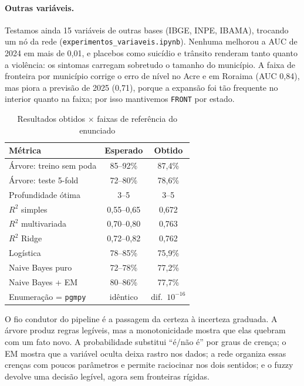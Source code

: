 \documentclass[article,12pt,oneside,a4paper,brazil,sumario=tradicional]{abntex2}
\newcommand{\fonteautores}{\fonte{Elaborada pelos autores (2026).}}
\begin{document}
\paragraph{Outras variáveis.}\label{sec:exp} Testamos ainda 15 variáveis de outras bases
(IBGE, INPE, IBAMA), trocando um nó da rede (\texttt{experimentos\_variaveis.ipynb}).
Nenhuma melhorou a AUC de 2024 em mais de 0,01, e placebos como suicídio e trânsito
renderam tanto quanto a violência: os sintomas carregam sobretudo o tamanho do município. A
faixa de fronteira por município corrige o erro de nível no Acre e em Roraima (AUC 0,84),
mas piora a previsão de 2025 (0,71), porque a expansão foi tão frequente no interior quanto
na faixa; por isso mantivemos \texttt{FRONT} por estado.

\begin{table}[htbp]
\centering\small
\caption{Resultados obtidos $\times$ faixas de referência do enunciado}\label{tab:ref}
\begin{tabular}{@{}lcc@{}}
\toprule
Métrica & Esperado & Obtido\\
\midrule
Árvore: treino sem poda & 85--92\% & 87,4\%\\
Árvore: teste 5-fold & 72--80\% & 78,6\%\\
Profundidade ótima & 3--5 & 3--5\\
$R^2$ simples & 0,55--0,65 & 0,672\\
$R^2$ multivariada & 0,70--0,80 & 0,763\\
$R^2$ Ridge & 0,72--0,82 & 0,762\\
Logística & 78--85\% & 75,9\%\\
Naive Bayes puro & 72--78\% & 77,2\%\\
Naive Bayes + EM & 80--86\% & 77,7\%\\
Enumeração = \texttt{pgmpy} & idêntico & dif.\ $10^{-16}$\\
\bottomrule
\end{tabular}
\fonteautores
\end{table}

O fio condutor do pipeline é a passagem da certeza à incerteza graduada. A árvore produz
regras legíveis, mas a monotonicidade mostra que elas quebram com um fato novo. A
probabilidade substitui ``é/não é'' por graus de crença; o EM mostra que a variável oculta
deixa rastro nos dados; a rede organiza essas crenças com poucos parâmetros e permite
raciocinar nos dois sentidos; e o fuzzy devolve uma decisão legível, agora sem fronteiras
rígidas.

\end{document}
